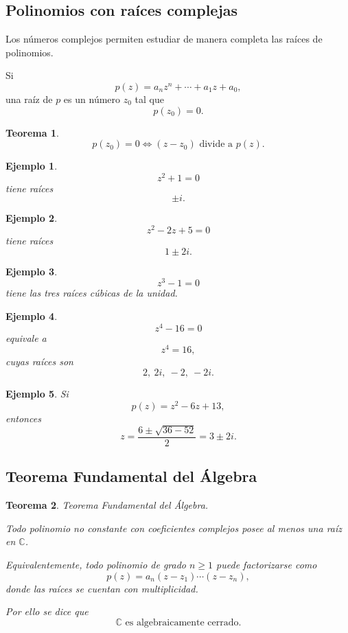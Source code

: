\documentclass[12pt]{article}
\newtheorem{Ejem}{Ejemplo}
\newtheorem{Teo}{Teorema}
\begin{document}
\subsection*{Polinomios con raíces complejas}

Los números complejos permiten estudiar de manera completa las raíces de polinomios.

Si
\[
p(z)=a_nz^n+\cdots+a_1z+a_0,
\]
una raíz de $p$ es un número $z_0$ tal que
\[
p(z_0)=0.
\]


\begin{Teo}

\[
p(z_0)=0
\iff
(z-z_0)\text{ divide a }p(z).
\]
\end{Teo}


\begin{Ejem}


\[
z^2+1=0
\]
tiene raíces
\[
\pm i.
\]

\end{Ejem}


\begin{Ejem}
\[
z^2-2z+5=0
\]
tiene raíces
\[
1\pm2i.
\]
\end{Ejem}


\begin{Ejem}
\[
z^3-1=0
\]
tiene las tres raíces cúbicas de la unidad.

\end{Ejem}


\begin{Ejem}
\[
z^4-16=0
\]
equivale a
\[
z^4=16,
\]
cuyas raíces son
\[
2,\ 2i,\ -2,\ -2i.
\]

\end{Ejem}


\begin{Ejem}
Si
\[
p(z)=z^2-6z+13,
\]
entonces
\[
z=\frac{6\pm\sqrt{36-52}}{2}=3\pm2i.
\]
\end{Ejem}



\subsection*{Teorema Fundamental del Álgebra}


\begin{Teo}{Teorema Fundamental del Álgebra.}

Todo polinomio no constante con coeficientes complejos posee al menos una raíz
en $\mathbb{C}$.

Equivalentemente, todo polinomio de grado $n\geq1$ puede factorizarse como
\[
\boxed{
p(z)
=
a_n
(z-z_1)\cdots(z-z_n),
}
\]
donde las raíces se cuentan con multiplicidad.

Por ello se dice que
\[
\boxed{
\mathbb{C}\text{ es algebraicamente cerrado}.
}
\]
\end{Teo}
\end{document}
